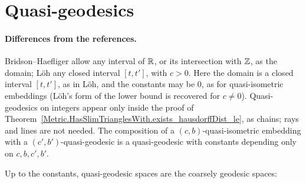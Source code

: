 




\section*{Quasi-geodesics}


\paragraph{Differences from the references.} Bridson--Haefliger allow any interval of $\mathbb{R}$, or its
intersection with $\mathbb{Z}$, as the domain; L\"oh any closed interval $[t, t']$, with $c > 0$. Here the
domain is a closed interval $[t, t']$, as in L\"oh, and the constants may be $0$, as for
quasi-isometric embeddings (L\"oh's form of the lower bound is recovered for $c \ne 0$).
Quasi-geodesics on integers appear only inside the proof of
Theorem~\ref{Metric.HasSlimTrianglesWith.exists_hausdorffDist_le}, as chains; rays and lines are
not needed. The composition of a $(c, b)$-quasi-isometric embedding with a
$(c', b')$-quasi-geodesic is a quasi-geodesic with constants depending only on $c, b, c', b'$.







Up to the constants, quasi-geodesic spaces are the coarsely geodesic spaces:

